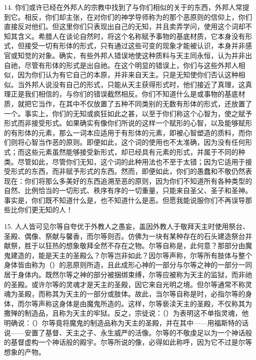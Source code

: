 14. 你们或许已经在外邦人的宗教中找到了与你们相似的关于的东西，外邦人常提到它。相反，你们却主张，在对你们的神学导师称为的那个恶原则的信仰上，你们直接反对他们。但这里你们只表现出自己的无知，并且卖弄学问，使用这个词却不知其含义。希腊人在谈论自然时，将这个名称赋予事物的基底材质，它本身没有形式，但接受一切有形体的形式，只有通过这些可变的现象才能被认识，本身并非感官或知觉的对象。确实，有些外邦人错误地使这种质料与天主同永恒，认为并非出自祂，尽管有形体的形式是出自祂。在这个明显的错误上，你们与这些外邦人相似，因为你们认为有它自己的本原，并非来自天主。只是无知使你们否认这种相似。当外邦人说没有自己的形式，只能从天主获得形式时，他们接近了真理，这真理正是我们相信的，与你们的错误截然相反。你们不知道什么是或事物的基底材质，就把它当作，在其中不仅放置了五种不同类别的无数有形体的形式，还放置了一个。事实上，你们的无知或疯狂如此之甚，以至于你们称这个心智为，使之赋予形式而非接受形式。如果确实有像你们所说的这样一个赋形的心智，以及能够赋形的有形体的元素，那么一词本应适用于有形体的元素，即被心智塑造的质料，而你们则将心智当作恶的原则。即便如此，这个词的使用也不太准确，因为没有任何形式；而这些元素虽然能够接受新形式，却已经具有元素的形式，并属于不同的种类。尽管如此，尽管你们无知，这个词的此种用法也不至于太错；因为它适用于接受形式的东西，而非赋予形式的东西。然而，即便如此，你们的愚蠢和不敬仍然表现在：你们将那么多美好的东西追溯至恶的原则，因为你们不知道所有各种类型的自然、比例恰当的一切形式、秩序有序的一切重量，只能来自圣父、圣子和圣神。事实是，你们既不知道什么是，也不知道什么是恶。但愿我能说服你们不再误导那些比你们更无知的人！\par

15. 人人皆可见尔等自夸优于外教人之愚妄，盖因外教人于敬拜天主时使用祭台、圣殿、偶像、祭献与馨香，而尔等则否。仿佛为一块有某种存在的石头建造祭台并献祭，胜于以狂热的想象敬拜全然不存在之物。尔等自称是，此何意？那部分由魔鬼建造的，能是天主的圣殿么？尔等岂非如此？因尔等声称，尔等所有肢体与整个身体皆由称为（）的恶原则所造，且此成形心神的一部分与尔等之神的一部分一同居于身体内。既然尔等之神的部分被捆绑束缚，尔等应被称为天主的监狱，而非祂的圣殿。或许尔等的灵魂才是天主的圣殿，因它来自光明之境。但尔等通常不称灵魂为圣殿，而称其为天主的一部分或肢体。故此，当尔等自称是时，必指尔等的身体，而尔等声称这身体是由魔鬼所造的。这样，尔等亵渎天主的圣殿，不仅称其为撒殚的制造品，且称为天主的牢狱。反之，宗徒说：（）为表明这不单指灵魂，他明确说：（）尔等竟将魔鬼的制造品称为天主的圣殿，并在其中——用福斯特的话说——安置了基督、天主之子、永生威严的活像。尔等的不敬虔足以为一个神话般的基督虚构一个神话般的殿宇。尔等所说的像，必得如此称呼，因为它不过是尔等想象的产物。\par

